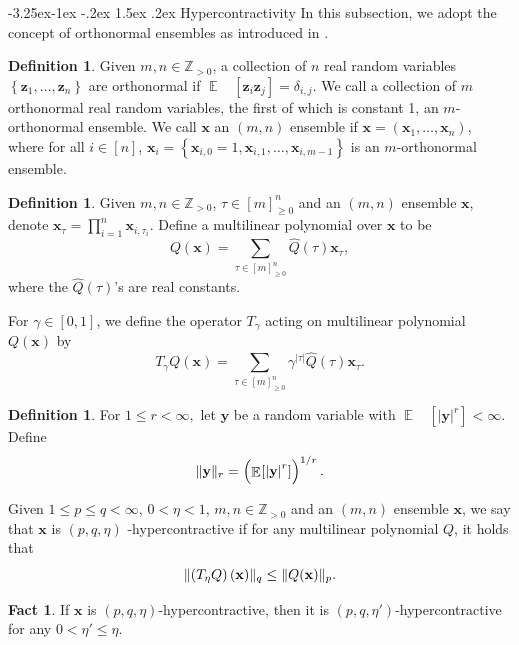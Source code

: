 \documentclass[10pt,a4paper]{article}
\makeatletter
\renewcommand{\subsection}{\@startsection{subsection}{2}{\z@}%
             {-3.25ex\@plus -1ex \@minus -.2ex}%
             {1.5ex \@plus .2ex}%
             {\normalfont\large\scshape\bfseries}}
\theoremstyle{plain}
\theoremstyle{definition}
\newtheorem{definition}[theorem]{Definition}
\newtheorem{fact}[theorem]{Fact}
\newcommand {\minusspace} {\: \! \!}
\newcommand {\Fn} [2] {\ensuremath{ #1 \minusspace \Br{ #2 } }}
\newcommand {\set} [1] {\ensuremath{ \left\lbrace #1 \right\rbrace }}
\newcommand {\br} [1] {\ensuremath{ \left( #1 \right) }}
\newcommand {\Br} [1] {\ensuremath{ \left[ #1 \right] }}
\DeclarePairedDelimiter{\norm}{\lVert}{\rVert}
\newcommand {\ab} [1] {\ensuremath{ \left| #1 \right| }}
\DeclareMathOperator*{\bigE}{\mathbb{E}}
\newcommand {\expec} [2] {\Fn{\bigE_{\substack{#1}}}{#2}}
\newcommand{\posint}{{\mathbb Z}_{>0}}
\newcommand{\randz}{\ensuremath{\mathbf{z}}}
\newcommand{\randx}{\ensuremath{\mathbf{x}}}
\newcommand{\randy}{\ensuremath{\mathbf{y}}}
\newcommand{\1}{\mathbb{1}} %
\makeatother
\begin{document}
\subsection{Hypercontractivity}
In this subsection,  we adopt the concept of orthonormal ensembles as introduced in \cite{mossel2005noise}.
\begin{definition}
Given $m,n\in\posint$, a collection of $n$ real random variables $\set{\randz_1,\ldots,\randz_n}$ are orthonormal if $\expec{}{\randz_i\randz_j}=\delta_{i,j}$. We call a collection of $m$ orthonormal real random variables, the first of which is constant 1, an $m$-orthonormal ensemble. We call $\randx$ an $(m,n)$ ensemble if $\randx = (\randx_1,\dots ,\randx_n)$, where for all $i\in[n]$, $\randx_i = \set{\randx_{i,0} = 1,\randx_{i,1},\dots,\randx_{i,m-1}}$ is an $m$-orthonormal ensemble. 
\end{definition}

\begin{definition}\label{def:defofT}
Given $m,n\in\posint$, $\tau\in\Br{m}^n_{\geq0}$ and an $(m,n)$ ensemble $\randx$, denote $\randx_\tau=\prod_{i=1}^n\randx_{i,\tau_i}$. Define a multilinear polynomial over $\randx$ to be 
\[Q(\randx)=\sum_{\tau\in\Br{m}^n_{\geq0}}\widehat{Q}\br{\tau}\randx_\tau,\]
where the $\widehat{Q}\br{\tau}$'s are real constants. 

For $\gamma\in[0,1]$, we define the operator $T_\gamma$ acting on multilinear polynomial $Q(\randx)$ by 
\[T_\gamma Q(\randx)=\sum_{\tau\in\Br{m}^n_{\geq0}}\gamma^{\ab{\tau}}\widehat{Q}\br{\tau}\randx_\tau.\]

\end{definition}

\begin{definition}
For $1\leq r<\infty,$ let $\randy$ be a random variable with $\expec{}{\ab{\randy}^r}<\infty$. Define 
\[\norm{\randy}_r=\br{\expec{}{\ab{\randy}^r}}^{1/r}.\]

Given $1\leq p\leq q<\infty$, $0<\eta<1$, $m,n\in\posint$ and an $(m,n)$ ensemble  $\randx$, we say that $\randx$ is $(p,q,\eta)$ -hypercontractive if for any multilinear polynomial $Q$, it holds that 
\[\norm{\br{T_\eta Q}(\randx)}_q\leq\norm{Q(\randx)}_p.\]
\end{definition}

\begin{fact}\cite[Remark 3.10]{mossel2005noise}\label{fact:hc}
If $\randx$ is $(p,q,\eta)$-hypercontractive, then it is  $(p,q,\eta')$-hypercontractive for any $0<\eta' \leq\eta$.
\end{fact}
\end{document}

